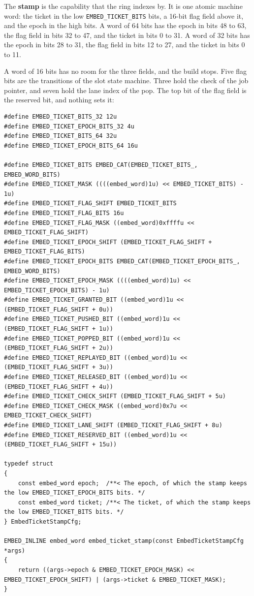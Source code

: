 The \textbf{stamp} is the capability that the ring indexes by. It is one atomic machine word: the ticket in the low \texttt{EMBED\_\allowbreak{}TICKET\_\allowbreak{}BITS} bits, a 16-bit flag field above it, and the epoch in the high bits. A word of 64 bits has the epoch in bits 48 to 63, the flag field in bits 32 to 47, and the ticket in bits 0 to 31. A word of 32 bits has the epoch in bits 28 to 31, the flag field in bits 12 to 27, and the ticket in bits 0 to 11.

A word of 16 bits has no room for the three fields, and the build stops. Five flag bits are the transitions of the slot state machine. Three hold the check of the job pointer, and seven hold the lane index of the pop. The top bit of the flag field is the reserved bit, and nothing sets it:

\begin{Verbatim}
#define EMBED_TICKET_BITS_32 12u
#define EMBED_TICKET_EPOCH_BITS_32 4u
#define EMBED_TICKET_BITS_64 32u
#define EMBED_TICKET_EPOCH_BITS_64 16u

#define EMBED_TICKET_BITS EMBED_CAT(EMBED_TICKET_BITS_, EMBED_WORD_BITS)
#define EMBED_TICKET_MASK ((((embed_word)1u) << EMBED_TICKET_BITS) - 1u)
#define EMBED_TICKET_FLAG_SHIFT EMBED_TICKET_BITS
#define EMBED_TICKET_FLAG_BITS 16u
#define EMBED_TICKET_FLAG_MASK ((embed_word)0xffffu << EMBED_TICKET_FLAG_SHIFT)
#define EMBED_TICKET_EPOCH_SHIFT (EMBED_TICKET_FLAG_SHIFT + EMBED_TICKET_FLAG_BITS)
#define EMBED_TICKET_EPOCH_BITS EMBED_CAT(EMBED_TICKET_EPOCH_BITS_, EMBED_WORD_BITS)
#define EMBED_TICKET_EPOCH_MASK ((((embed_word)1u) << EMBED_TICKET_EPOCH_BITS) - 1u)
#define EMBED_TICKET_GRANTED_BIT ((embed_word)1u << (EMBED_TICKET_FLAG_SHIFT + 0u))
#define EMBED_TICKET_PUSHED_BIT ((embed_word)1u << (EMBED_TICKET_FLAG_SHIFT + 1u))
#define EMBED_TICKET_POPPED_BIT ((embed_word)1u << (EMBED_TICKET_FLAG_SHIFT + 2u))
#define EMBED_TICKET_REPLAYED_BIT ((embed_word)1u << (EMBED_TICKET_FLAG_SHIFT + 3u))
#define EMBED_TICKET_RELEASED_BIT ((embed_word)1u << (EMBED_TICKET_FLAG_SHIFT + 4u))
#define EMBED_TICKET_CHECK_SHIFT (EMBED_TICKET_FLAG_SHIFT + 5u)
#define EMBED_TICKET_CHECK_MASK ((embed_word)0x7u << EMBED_TICKET_CHECK_SHIFT)
#define EMBED_TICKET_LANE_SHIFT (EMBED_TICKET_FLAG_SHIFT + 8u)
#define EMBED_TICKET_RESERVED_BIT ((embed_word)1u << (EMBED_TICKET_FLAG_SHIFT + 15u))

typedef struct
{
    const embed_word epoch;  /**< The epoch, of which the stamp keeps the low EMBED_TICKET_EPOCH_BITS bits. */
    const embed_word ticket; /**< The ticket, of which the stamp keeps the low EMBED_TICKET_BITS bits. */
} EmbedTicketStampCfg;

EMBED_INLINE embed_word embed_ticket_stamp(const EmbedTicketStampCfg *args)
{
    return ((args->epoch & EMBED_TICKET_EPOCH_MASK) << EMBED_TICKET_EPOCH_SHIFT) | (args->ticket & EMBED_TICKET_MASK);
}
\end{Verbatim}

